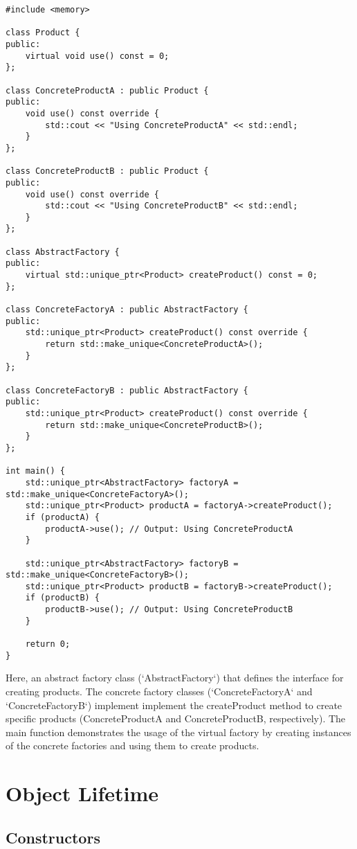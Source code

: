 \begin{verbatim}
#include <memory>

class Product {
public:
    virtual void use() const = 0;
};

class ConcreteProductA : public Product {
public:
    void use() const override {
        std::cout << "Using ConcreteProductA" << std::endl;
    }
};

class ConcreteProductB : public Product {
public:
    void use() const override {
        std::cout << "Using ConcreteProductB" << std::endl;
    }
};

class AbstractFactory {
public:
    virtual std::unique_ptr<Product> createProduct() const = 0;
};

class ConcreteFactoryA : public AbstractFactory {
public:
    std::unique_ptr<Product> createProduct() const override {
        return std::make_unique<ConcreteProductA>();
    }
};

class ConcreteFactoryB : public AbstractFactory {
public:
    std::unique_ptr<Product> createProduct() const override {
        return std::make_unique<ConcreteProductB>();
    }
};

int main() {
    std::unique_ptr<AbstractFactory> factoryA = std::make_unique<ConcreteFactoryA>();
    std::unique_ptr<Product> productA = factoryA->createProduct();
    if (productA) {
        productA->use(); // Output: Using ConcreteProductA
    }
    
    std::unique_ptr<AbstractFactory> factoryB = std::make_unique<ConcreteFactoryB>();
    std::unique_ptr<Product> productB = factoryB->createProduct();
    if (productB) {
        productB->use(); // Output: Using ConcreteProductB
    }
    
    return 0;
}
\end{verbatim}

Here, an abstract factory class (`AbstractFactory`) that defines the interface for creating products.
The concrete factory classes (`ConcreteFactoryA` and `ConcreteFactoryB`) implement
implement the createProduct method to create specific products (ConcreteProductA and ConcreteProductB, respectively).
The main function demonstrates the usage of 
the virtual factory by creating instances of the concrete factories and using them to create products.

\chapter{Object Lifetime}

\section{Constructors}

